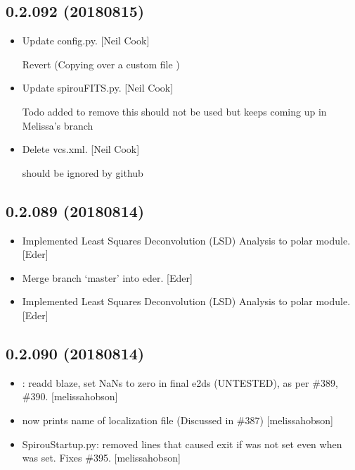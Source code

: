 \documentclass[a4paper,10pt,english]{report}
\begin{document}
\subsection{0.2.092 (2018\sphinxhyphen{}08\sphinxhyphen{}15)}
\label{\detokenize{misc/changelog:id389}}\begin{itemize}
\item {} 
Update config.py. {[}Neil Cook{]}

Revert  (Copying over a custom  file )

\item {} 
Update spirouFITS.py. {[}Neil Cook{]}

Todo added to remove  this should not be used \sphinxhyphen{} but keeps coming up in Melissa’s branch

\item {} 
Delete vcs.xml. {[}Neil Cook{]}

should be ignored by github

\end{itemize}


\subsection{0.2.089 (2018\sphinxhyphen{}08\sphinxhyphen{}14)}
\label{\detokenize{misc/changelog:id390}}\begin{itemize}
\item {} 
Implemented Least Squares Deconvolution (LSD) Analysis to polar
module. {[}Eder{]}

\item {} 
Merge branch ‘master’ into eder. {[}Eder{]}

\item {} 
Implemented Least Squares Deconvolution (LSD) Analysis to polar
module. {[}Eder{]}

\end{itemize}


\subsection{0.2.090 (2018\sphinxhyphen{}08\sphinxhyphen{}14)}
\label{\detokenize{misc/changelog:id391}}\begin{itemize}
\item {} 
: re\sphinxhyphen{}add blaze, set NaNs to zero in final e2ds
(UNTESTED), as per \#389, \#390. {[}melissa\sphinxhyphen{}hobson{]}

\item {} 
 now prints name of localization file (Discussed in
\#387) {[}melissa\sphinxhyphen{}hobson{]}

\item {} 
SpirouStartup.py: removed lines that caused exit if  was not
set even when  was set. Fixes \#395. {[}melissa\sphinxhyphen{}hobson{]}

\end{itemize}
\end{document}
